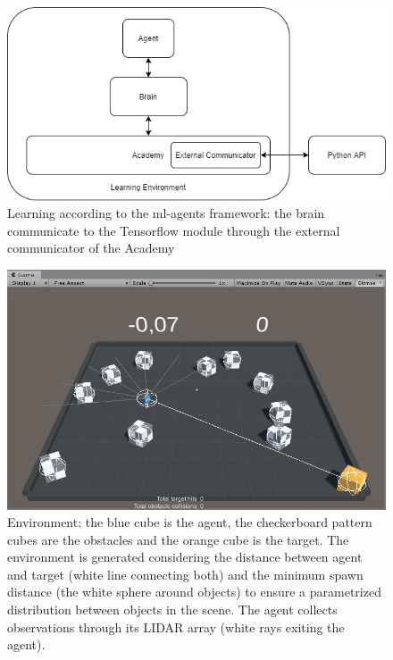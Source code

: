 \documentclass{ifacconf}
\begin{document}
\begin{figure}[H]
\begin{center}
\includegraphics[width=\linewidth]{res/learning_env.png} 
\caption{Learning according to the ml-agents framework: the brain communicate to the Tensorflow module through the external communicator of the Academy} 
\label{fig:learning_env}
\end{center}
\end{figure}


\begin{figure}[H]
\begin{center}
\includegraphics[width=\linewidth]{res/un_env.png} 
\caption{Environment: the blue cube is the agent, the checkerboard pattern cubes are the obstacles and the orange cube is the target. The environment is generated considering the distance between agent and target (white line connecting both) and the minimum spawn distance (the white sphere around objects) to ensure a parametrized distribution between objects in the scene. The agent collects observations through its LIDAR array (white rays exiting the agent).} 
\label{fig:graphical_env}
\end{center}
\end{figure}
\end{document}
